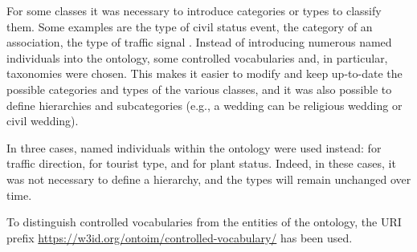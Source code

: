 For some classes it was necessary to introduce categories or types to classify them. Some examples are the type of civil status event, the category of an association, the type of traffic signal \etc. Instead of introducing numerous named individuals into the ontology, some controlled vocabularies and, in particular, taxonomies were chosen. This makes it easier to modify and keep up-to-date the possible categories and types of the various classes, and it was also possible to define hierarchies and subcategories (e.g., a wedding can be religious wedding or civil wedding).

In three cases, named individuals within the ontology were used instead: for traffic direction, for tourist type, and for plant status. Indeed, in these cases, it was not necessary to define a hierarchy, and the types will remain unchanged over time.

To distinguish controlled vocabularies from the entities of the ontology, the \ac{URI} prefix \url{https://w3id.org/ontoim/controlled-vocabulary/} has been used.